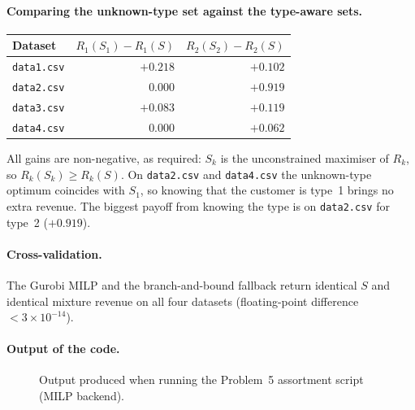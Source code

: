 \documentclass[11pt]{article}
\begin{document}
\paragraph{Comparing the unknown-type set against the type-aware sets.}
\begin{center}
\begin{tabular}{lrr}
\toprule
Dataset & $R_1(S_1) - R_1(S)$ & $R_2(S_2) - R_2(S)$ \\
\midrule
\texttt{data1.csv} & $+0.218$ & $+0.102$ \\
\texttt{data2.csv} & $\phantom{+}0.000$ & $+0.919$ \\
\texttt{data3.csv} & $+0.083$ & $+0.119$ \\
\texttt{data4.csv} & $\phantom{+}0.000$ & $+0.062$ \\
\bottomrule
\end{tabular}
\end{center}

All gains are non-negative, as required: $S_k$ is the unconstrained maximiser
of $R_k$, so $R_k(S_k) \ge R_k(S)$. On \texttt{data2.csv} and
\texttt{data4.csv} the unknown-type optimum coincides with $S_1$, so knowing
that the customer is type~1 brings no extra revenue. The biggest payoff
from knowing the type is on \texttt{data2.csv} for type~2 ($+0.919$).

\paragraph{Cross-validation.}
The Gurobi MILP and the branch-and-bound fallback return identical
$S$ and identical mixture revenue on all four datasets (floating-point
difference $<3\!\times\!10^{-14}$).

\paragraph{Output of the code.}
\begin{figure}[h!]
  \centering
  \caption{Output produced when running the Problem~5 assortment script (MILP backend).}
\end{figure}
\end{document}
